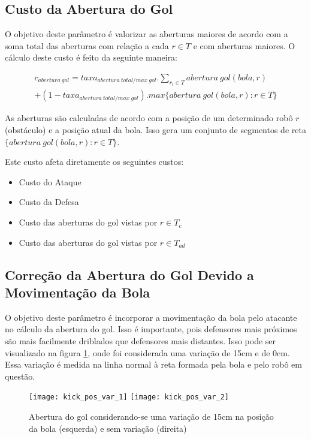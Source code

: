 \subsection{Custo da Abertura do Gol}\label{subsec:custo_gap}

O objetivo deste parâmetro é valorizar as aberturas maiores de acordo com a soma
total das aberturas com relação a cada $r \in T$ e com aberturas maiores.  O
cálculo deste custo é feito da seguinte maneira:

\begin{multline} 
 c_{abertura{\ }gol} = taxa_{abertura{\ }total/max{\ }gol} .
   \sum_{r_i \in T} abertura{\ }gol(bola, r)\\
   + (1 - taxa_{abertura{\ }total/max{\ }gol}) .
   max \lbrace abertura{\ }gol(bola, r): r \in T \rbrace
\end{multline}

As aberturas são calculadas de acordo com a posição de um determinado robô $r$
(obstáculo) e a posição atual da bola. Isso gera um conjunto de segmentos de
reta $\lbrace abertura{\ }gol(bola, r): r \in T \rbrace$.

Este custo afeta diretamente os seguintes custos:
\begin{itemize}
  \item Custo do Ataque
  \item Custo da Defesa
  \item Custo das aberturas do gol vistas por $r\in T_c$
  \item Custo das aberturas do gol vistas por $r\in T_{ad}$
\end{itemize}

\subsection{Correção da Abertura do Gol Devido a Movimentação da Bola}

O objetivo deste parâmetro é incorporar a movimentação da bola pelo atacante no
cálculo da abertura do gol. Isso é importante, pois defensores mais próximos são
mais facilmente driblados que defensores mais distantes. Isso pode ser
visualizado na figura \ref{fig:kick_pos}, onde foi considerada uma variação de
15cm e de 0cm. Essa variação é medida na linha normal à reta formada pela bola e
pelo robô em questão.


\begin{figure}[H]
  \centering
  \texttt{[image: kick\_pos\_var\_1]}
  \texttt{[image: kick\_pos\_var\_2]}
  \caption{Abertura do gol considerando-se uma variação de 15cm na posição da
  bola (esquerda) e sem variação (direita)}\label{fig:kick_pos}
\end{figure}


